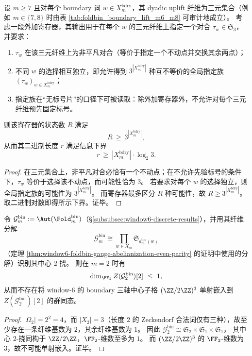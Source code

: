 \begin{proposition}[三层纤维上的逐词独立片翻转所需的外加信息量下界]\label{prop:bdry-independent-sheetflip-register-lower-bound}
设 \(m\ge 7\) 且对每个 boundary 词 \(w\in X_m^{\mathrm{bdry}}\)，其 dyadic uplift 纤维为三元集合（例如 \(m\in\{7,8\}\) 时由表 \ref{tab:foldbin_boundary_lift_m6_m8} 可审计地成立）。
考虑一段外加寄存器，其输出用于在每个 \(w\) 的三元纤维上指定一个对合 \(\tau_w\in\mathfrak S_3\)，并要求：
\begin{enumerate}
  \item \(\tau_w\) 在该三元纤维上为非平凡对合（等价于指定一个不动点并交换其余两点）；
  \item 不同 \(w\) 的选择相互独立，即允许得到 \(3^{|X_m^{\mathrm{bdry}}|}\) 种互不等价的全局指定族 \((\tau_w)_{w\in X_m^{\mathrm{bdry}}}\)；
  \item 指定族在“无标号片”的口径下可被读取：除外加寄存器外，不允许对每个三元纤维预先固定标号。
\end{enumerate}
则该寄存器的状态数 \(R\) 满足
\[
R\ \ge\ 3^{|X_m^{\mathrm{bdry}}|},
\]
从而其二进制长度 \(r\) 满足信息下界
\[
r\ \ge\ |X_m^{\mathrm{bdry}}|\cdot \log_2 3.
\]
\end{proposition}
\begin{proof}
在三元集合上，非平凡对合必恰有一个不动点；在不允许先验标号的条件下，\(\tau_w\) 等价于选择该不动点，而可能性恰为 \(3\)。
若要求对每个 \(w\) 的选择独立，则全局指定族的可能性为 \(3^{|X_m^{\mathrm{bdry}}|}\)。
而寄存器最多区分 \(R\) 种可能性，故 \(R\ge 3^{|X_m^{\mathrm{bdry}}|}\)。
取二进制对数即得所示下界。证毕。
\end{proof}

\begin{corollary}\label{cor:foldbin-center-2torsion-dimension-obstruction-m2}
令 \(\mathcal{G}^{\mathrm{bin}}_m:=\Aut(\Fold^{\mathrm{bin}}_m)\)（\S\ref{subsubsec:window6-discrete-results}），并用其纤维分解
\[
\mathcal{G}^{\mathrm{bin}}_m\cong \prod_{w\in X_m}\mathfrak S_{d^{\mathrm{bin}}_m(w)}
\]
（定理 \ref{thm:window6-foldbin-gauge-abelianization-even-parity} 的证明中使用的分解）识别其中心 \(2\)-挠。
则在 \(m=2\) 时有
\[
\dim_{\FF_2} Z(\mathcal{G}^{\mathrm{bin}}_2)[2]\ \le\ 1,
\]
从而不存在将 window-\(6\) 的 boundary 三轴中心子格 \((\ZZ/2\ZZ)^3\) 单射嵌入到 \(Z(\mathcal{G}^{\mathrm{bin}}_2)[2]\) 的群同态。
\end{corollary}
\begin{proof}
\(|\Omega_2|=2^2=4\)，而 \(|X_2|=3\)（长度 \(2\) 的 Zeckendorf 合法词仅有三种），故至少存在一条纤维基数为 \(2\)，其余纤维基数为 \(1\)。
因此
\(
\mathcal{G}^{\mathrm{bin}}_2\cong \mathfrak S_2\times \mathfrak S_1\times \mathfrak S_1
\)，
其中心 \(2\)-挠同构于 \(\ZZ/2\ZZ\)，\(\FF_2\)-维数至多为 \(1\)。
而 \((\ZZ/2\ZZ)^3\) 的 \(\FF_2\)-维数为 \(3\)，故不可能单射嵌入。证毕。
\end{proof}
